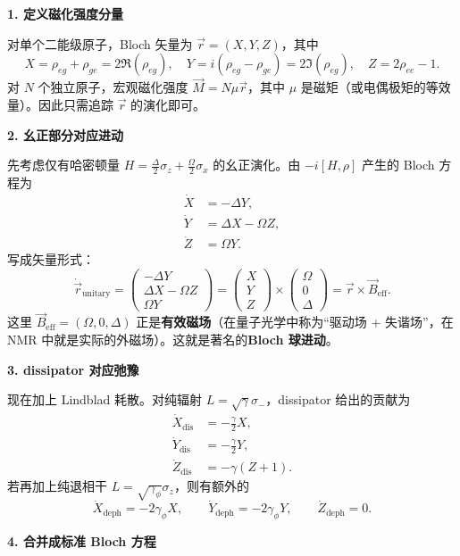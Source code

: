 \textbf{1. 定义磁化强度分量}

对单个二能级原子，Bloch 矢量为 $\vec{r}=(X,Y,Z)$，其中
\[
X = \rho_{eg}+\rho_{ge} = 2\Re(\rho_{eg}), \quad
Y = i(\rho_{eg}-\rho_{ge}) = 2\Im(\rho_{eg}), \quad
Z = 2\rho_{ee}-1.
\]
对 $N$ 个独立原子，宏观磁化强度 $\vec{M} = N\mu\vec{r}$，其中 $\mu$ 是磁矩（或电偶极矩的等效量）。因此只需追踪 $\vec{r}$ 的演化即可。

\textbf{2. 幺正部分对应进动}

先考虑仅有哈密顿量 $H = \frac{\Delta}{2}\sigma_z + \frac{\Omega}{2}\sigma_x$ 的幺正演化。由 $-i[H,\rho]$ 产生的 Bloch 方程为
\begin{align*}
\dot{X} &= -\Delta Y, \\
\dot{Y} &= \Delta X - \Omega Z, \\
\dot{Z} &= \Omega Y.
\end{align*}
写成矢量形式：
\[
\dot{\vec{r}}_{\text{unitary}} = \begin{pmatrix} -\Delta Y \\ \Delta X - \Omega Z \\ \Omega Y \end{pmatrix}
= \begin{pmatrix} X \\ Y \\ Z \end{pmatrix}
\times \begin{pmatrix} \Omega \\ 0 \\ \Delta \end{pmatrix}
= \vec{r} \times \vec{B}_{\text{eff}}.
\]
这里 $\vec{B}_{\text{eff}} = (\Omega, 0, \Delta)$ 正是\textbf{有效磁场}（在量子光学中称为``驱动场 + 失谐场''，在 NMR 中就是实际的外磁场）。这就是著名的\textbf{Bloch 球进动}。

\textbf{3. dissipator 对应弛豫}

现在加上 Lindblad 耗散。对纯辐射 $L=\sqrt{\gamma}\sigma_-$，dissipator 给出的贡献为
\begin{align*}
\dot{X}_{\text{dis}} &= -\frac{\gamma}{2}X, \\
\dot{Y}_{\text{dis}} &= -\frac{\gamma}{2}Y, \\
\dot{Z}_{\text{dis}} &= -\gamma(Z+1).
\end{align*}
若再加上纯退相干 $L=\sqrt{\gamma_\phi}\sigma_z$，则有额外的
\[
\dot{X}_{\text{deph}} = -2\gamma_\phi X, \qquad
\dot{Y}_{\text{deph}} = -2\gamma_\phi Y, \qquad
\dot{Z}_{\text{deph}} = 0.
\]

\textbf{4. 合并成标准 Bloch 方程}


